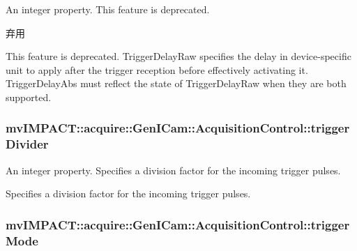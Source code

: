 An integer property. This feature is deprecated. 

\begin{DoxyRefDesc}{弃用}
\item[\hyperlink{deprecated__deprecated000045}{弃用}]This feature is deprecated. Trigger\+Delay\+Raw specifies the delay in device-\/specific unit to apply after the trigger reception before effectively activating it. Trigger\+Delay\+Abs must reflect the state of Trigger\+Delay\+Raw when they are both supported. \end{DoxyRefDesc}
\hypertarget{classmv_i_m_p_a_c_t_1_1acquire_1_1_gen_i_cam_1_1_acquisition_control_afd3efded5da820a4dbe8510bf3e40471}{
\subsubsection[{trigger\+Divider}]{ mv\+I\+M\+P\+A\+C\+T\+::acquire\+::\+Gen\+I\+Cam\+::\+Acquisition\+Control\+::trigger\+Divider}}\label{classmv_i_m_p_a_c_t_1_1acquire_1_1_gen_i_cam_1_1_acquisition_control_afd3efded5da820a4dbe8510bf3e40471}


An integer property. Specifies a division factor for the incoming trigger pulses. 

Specifies a division factor for the incoming trigger pulses. \hypertarget{classmv_i_m_p_a_c_t_1_1acquire_1_1_gen_i_cam_1_1_acquisition_control_a42ea8092a767cd62a5b59119d348701b}{
\subsubsection[{trigger\+Mode}]{ mv\+I\+M\+P\+A\+C\+T\+::acquire\+::\+Gen\+I\+Cam\+::\+Acquisition\+Control\+::trigger\+Mode}}\label{classmv_i_m_p_a_c_t_1_1acquire_1_1_gen_i_cam_1_1_acquisition_control_a42ea8092a767cd62a5b59119d348701b}


